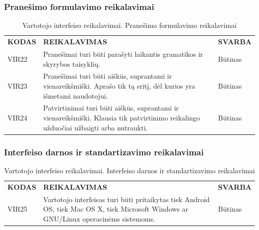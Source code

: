 \documentclass{VUMIFPSkursinis}
\begin{document}
\subsubsection{Pranešimo formulavimo reikalavimai}
\begin{table}[H]
\caption{Vartotojo interfeiso reikalavimai. Pranešimo formulavimo reikalavimai}
\centering
\normalsize
\begin{tabular}{|p{2cm}|p{10cm}|p{3cm}|}
\hline
\rowcolor{gray!30}
\multicolumn{3}{|l|}{\textbf{5.	Pranešimo formulavimo reikalavimai}} \\ \hline
\textbf{KODAS}& \multicolumn{1}{m{10cm}|}{\textbf{REIKALAVIMAS}} & \textbf{SVARBA} \\ \hline
VIR22 & \multicolumn{1}{m{10cm}|}{Pranešimai turi būti parašyti laikantis gramatikos ir skyrybos taisyklių.} & Būtinas \\ \hline
VIR23 & \multicolumn{1}{m{10cm}|}{Pranešimai turi būti aiškūs, suprantami ir vienareikšmiški. Aprašo tik tą sritį, dėl kurios yra išmetami naudotojui.} & Būtinas \\ \hline
VIR24 & \multicolumn{1}{m{10cm}|}{Patvirtinimai turi būti aiškūs, suprantami ir vienareikšmiški. Klausia tik patvirtinimo reikalingo užduočiai užbaigti arba nutraukti.} & Būtinas \\ \hline
\end{tabular}
\end{table}

\subsubsection{Interfeiso darnos ir standartizavimo reikalavimai}
\begin{table}[H]
\caption{Vartotojo interfeiso reikalavimai. Interfeiso darnos ir standartizavimo reikalavimai}
\centering
\normalsize
\begin{tabular}{|p{2cm}|p{10cm}|p{3cm}|}
\hline
\rowcolor{gray!30}
\multicolumn{3}{|l|}{\textbf{6.	Interfeiso darnos ir standartizavimo reikalavimai}} \\ \hline
\textbf{KODAS}& \multicolumn{1}{m{10cm}|}{\textbf{REIKALAVIMAS}} & \textbf{SVARBA} \\ \hline
VIR25 & \multicolumn{1}{m{10cm}|}{Vartotojo interfeisas turi būti pritaikytas tiek Android OS, tiek Mac OS X, tiek Microsoft Windows ar GNU/Linux operacinėms sistemoms.} & Būtinas \\ \hline
\end{tabular}
\end{table}
\end{document}
